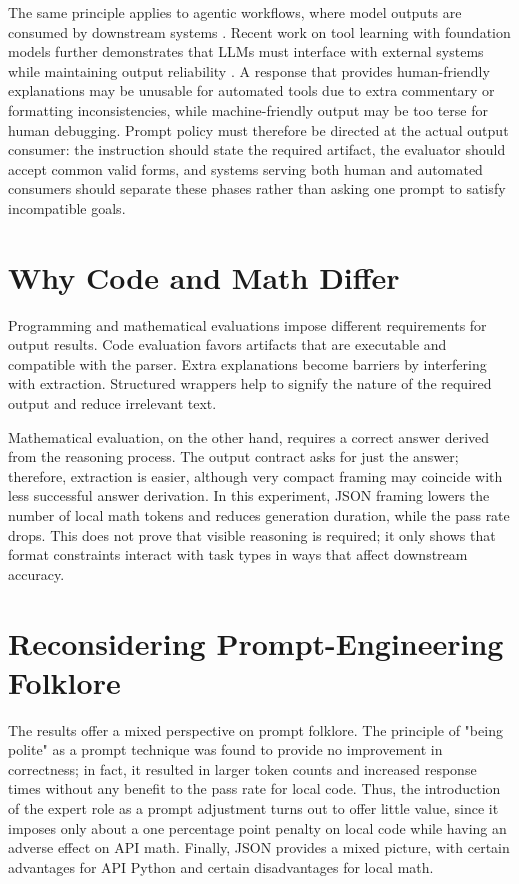 The same principle applies to agentic workflows, where model outputs are consumed by downstream systems \cite{liu2023agentbench, wang2024agent, xi2023rise}. Recent work on tool learning with foundation models further demonstrates that LLMs must interface with external systems while maintaining output reliability \cite{qin2023tool}. A response that provides human-friendly explanations may be unusable for automated tools due to extra commentary or formatting inconsistencies, while machine-friendly output may be too terse for human debugging. Prompt policy must therefore be directed at the actual output consumer: the instruction should state the required artifact, the evaluator should accept common valid forms, and systems serving both human and automated consumers should separate these phases rather than asking one prompt to satisfy incompatible goals.

\section{Why Code and Math Differ}

Programming and mathematical evaluations impose different requirements for output results. Code evaluation favors artifacts that are executable and compatible with the parser. Extra explanations become barriers by interfering with extraction. Structured wrappers help to signify the nature of the required output and reduce irrelevant text.

Mathematical evaluation, on the other hand, requires a correct answer derived from the reasoning process. The output contract asks for just the answer; therefore, extraction is easier, although very compact framing may coincide with less successful answer derivation. In this experiment, JSON framing lowers the number of local math tokens and reduces generation duration, while the pass rate drops. This does not prove that visible reasoning is required; it only shows that format constraints interact with task types in ways that affect downstream accuracy.

\section{Reconsidering Prompt-Engineering Folklore}

The results offer a mixed perspective on prompt folklore. The principle of "being polite" as a prompt technique was found to provide no improvement in correctness; in fact, it resulted in larger token counts and increased response times without any benefit to the pass rate for local code. Thus, the introduction of the expert role as a prompt adjustment turns out to offer little value, since it imposes only about a one percentage point penalty on local code while having an adverse effect on API math. Finally, JSON provides a mixed picture, with certain advantages for API Python and certain disadvantages for local math.

